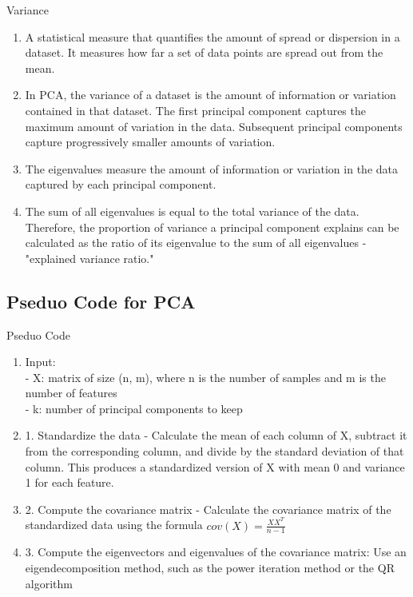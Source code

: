 \documentclass{beamer}
\begin{document}
\begin{frame}{Variance}
    \begin{enumerate}
        \item A statistical measure that quantifies the amount of spread or dispersion in a dataset. It measures how far a set of data points are spread out from the mean.
        \item  In PCA, the variance of a dataset is the amount of information or variation contained in that dataset. The first principal component captures the maximum amount of variation in the data. Subsequent principal components capture progressively smaller amounts of variation.
        \item The eigenvalues measure the amount of information or variation in the data captured by each principal component.
        \item The sum of all eigenvalues is equal to the total variance of the data. Therefore, the proportion of variance a principal component explains can be calculated as the ratio of its eigenvalue to the sum of all eigenvalues - "explained variance ratio."

    \end{enumerate}
\end{frame}

\subsection{Pseduo Code for PCA}
\begin{frame}{Pseduo Code}
    \begin{enumerate}
        \item Input: \\
              - X: matrix of size (n, m), where n is the number of samples and m is the number of features\\
              - k: number of principal components to keep
        \item 1. Standardize the data - Calculate the mean of each column of X, subtract it from the corresponding column, and divide by the standard deviation of that column. This produces a standardized version of X with mean 0 and variance 1 for each feature.
        \item 2. Compute the covariance matrix - Calculate the covariance matrix of the standardized data using the formula $cov(X) = \frac{XX^T}{n - 1}$
        \item 3. Compute the eigenvectors and eigenvalues of the covariance matrix: Use an eigendecomposition method, such as the power iteration method or the QR algorithm

    \end{enumerate}
\end{frame}
\end{document}

